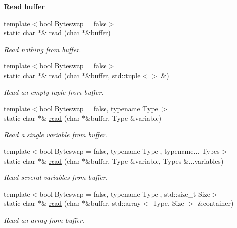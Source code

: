 \begin{Indent}{\bf Read buffer}\par
\begin{DoxyCompactItemize}
\item 
{\footnotesize template$<$bool Byteswap = false$>$ }\\static char $\ast$\& \hyperlink{exceptionmagrathea_1_1DataHandler_abb1758c0b2f72e48f5ef7db95b016ccf}{read} (char $\ast$\&buffer)
\begin{DoxyCompactList}\small\item\em Read nothing from buffer. \end{DoxyCompactList}\item 
{\footnotesize template$<$bool Byteswap = false$>$ }\\static char $\ast$\& \hyperlink{exceptionmagrathea_1_1DataHandler_a4fb8e4a637b6f4c3c798b1b94e568007}{read} (char $\ast$\&buffer, std\-::tuple$<$$>$ \&)
\begin{DoxyCompactList}\small\item\em Read an empty tuple from buffer. \end{DoxyCompactList}\item 
{\footnotesize template$<$bool Byteswap = false, typename Type $>$ }\\static char $\ast$\& \hyperlink{exceptionmagrathea_1_1DataHandler_aa8fe6c9d3f4a56d178898ba64cdc93f8}{read} (char $\ast$\&buffer, Type \&variable)
\begin{DoxyCompactList}\small\item\em Read a single variable from buffer. \end{DoxyCompactList}\item 
{\footnotesize template$<$bool Byteswap = false, typename Type , typename... Types$>$ }\\static char $\ast$\& \hyperlink{exceptionmagrathea_1_1DataHandler_ae73602c0c41147651f1ce8c7cbc206f6}{read} (char $\ast$\&buffer, Type \&variable, Types \&...variables)
\begin{DoxyCompactList}\small\item\em Read several variables from buffer. \end{DoxyCompactList}\item 
{\footnotesize template$<$bool Byteswap = false, typename Type , std\-::size\-\_\-t Size$>$ }\\static char $\ast$\& \hyperlink{exceptionmagrathea_1_1DataHandler_a6d8fa8651ee32050d8eb6eaf435db2c7}{read} (char $\ast$\&buffer, std\-::array$<$ Type, Size $>$ \&container)
\begin{DoxyCompactList}\small\item\em Read an array from buffer. \end{DoxyCompactList}\item 
$$
\end{DoxyCompactItemize}
\end{Indent}
